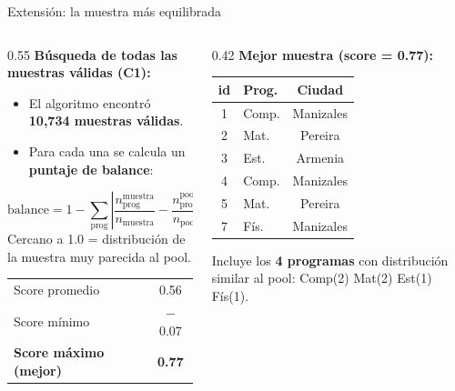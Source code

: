 \documentclass[aspectratio=169, 10pt]{beamer}
\begin{document}
\begin{frame}{Extensión: la muestra más equilibrada}
  \begin{columns}[T]
    \begin{column}{0.55\textwidth}
      \textbf{Búsqueda de todas las muestras válidas (C1):}
      \begin{itemize}
        \item El algoritmo encontró \textbf{10,734 muestras válidas}.
        \item Para cada una se calcula un \textbf{puntaje de balance}:
      \end{itemize}
      \vspace{0.2cm}
      \[
        \text{balance} = 1 - \sum_{\text{prog}} \left|\frac{n_{\text{prog}}^{\text{muestra}}}{n_{\text{muestra}}} - \frac{n_{\text{prog}}^{\text{pool}}}{n_{\text{pool}}}\right|
      \]
      \vspace{0.1cm}
      Cercano a 1.0 = distribución de la muestra muy parecida al pool.

      \vspace{0.3cm}
      \begin{tabular}{lc}
        \toprule
        Score promedio & 0.56 \\
        Score mínimo   & $-$0.07 \\
        \textbf{Score máximo (mejor)} & \textbf{0.77} \\
        \bottomrule
      \end{tabular}
    \end{column}
    \begin{column}{0.42\textwidth}
      \textbf{Mejor muestra (score = 0.77):}
      \vspace{0.2cm}
      \begin{center}
        \small
        \begin{tabular}{clc}
          \toprule
          \textbf{id} & \textbf{Prog.} & \textbf{Ciudad} \\
          \midrule
          1  & Comp.  & Manizales \\
          2  & Mat.   & Pereira   \\
          3  & Est.   & Armenia   \\
          4  & Comp.  & Manizales \\
          5  & Mat.   & Pereira   \\
          7  & Fís.   & Manizales \\
          \bottomrule
        \end{tabular}
      \end{center}
      \vspace{0.2cm}
      \small Incluye los \textbf{4 programas} con distribución similar al pool: Comp(2) Mat(2) Est(1) Fís(1).
    \end{column}
  \end{columns}
\end{frame}
\end{document}
